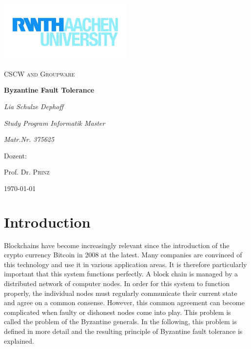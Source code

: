 \documentclass[12pt]{article}
\begin{document}
%
%
\begin{titlepage}
	\centering
	\includegraphics[width=0.5\textwidth]{logo.png}\par\vspace{1cm}
	\vspace{1cm}
	{\scshape\Large CSCW and Groupware\par}
	\vspace{1.5cm}
	{\huge\bfseries Byzantine Fault Tolerance \par}
	\vspace{2cm}
	{\Large\itshape Lia Schulze Dephoff\par}
	{\itshape Study Program Informatik Master\par}
	{\itshape Matr.Nr. 375625\par}
	\vfill
	Dozent:\par
	Prof. Dr. \textsc{Prinz}

	\vfill

	{\large \today\par}
\end{titlepage}

%
%
\newpage
\tableofcontents 
\newpage
%
%
\section{Introduction}
Blockchains have become increasingly relevant since the introduction of the crypto currency Bitcoin in 2008 at the latest. Many companies are convinced of this technology and use it in various application areas. It is therefore particularly important that this system functions perfectly. A block chain is managed by a distributed network of computer nodes. In order for this system to function properly, the individual nodes must regularly communicate their current state and agree on a common consense. However, this common agreement can become complicated when faulty or dishonest nodes come into play. This problem is called the problem of the Byzantine generals. In the following, this problem is defined in more detail and the resulting principle of Byzantine fault tolerance is explained.
\end{document}
